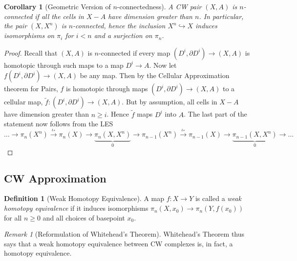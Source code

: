 \documentclass[reqno]{amsart}
\newtheorem{corollary}[theorem]{Corollary}
\theoremstyle{definition}
\newtheorem{definition}[theorem]{Definition}
\theoremstyle{remark}
\newtheorem*{remark}{Remark}
\begin{document}
\begin{corollary}[Geometric Version of
    $n$-connectedness]\label{n-connectedness-geometrically}
    A CW pair $\left( X,A \right) $ is $n$-connected
    if all the cells in $X - A$ have dimension
    greater than $n$. In particular, the
    pair  $\left( X, X^{n} \right) $ is
    $n$-connected, hence the
    inclusion $X^{n} \hookrightarrow X$ induces
    isomorphisms on $\pi_i$ for $i < n$ and
    a surjection on $\pi_n$.
\end{corollary}

\begin{proof}
    Recall that $\left( X,A \right) $ is $n$-connected
    if every map
    $\left( D^{i}, \partial D^{i} \right) 
    \to \left( X,A \right) $ is homotopic through
    such maps to a map $D^{i} \to A$.
    Now let
    $f \left( D^{i}, \partial D^{i} \right) 
    \to \left( X,A \right) $ be any map.
    Then by the Cellular Approximation theorem for
    Pairs, $f$ is homotopic through maps
    $\left( D^{i} ,\partial D^{i} \right) \to 
    \left( X,A \right) $ to a cellular map, 
    $\tilde{f} \colon \left( D^{i} , \partial D^{i} \right) 
    \to \left( X,A \right) $. But by assumption, all
    cells in $X-A$ have dimension greater than
    $n \ge i$. Hence $\tilde{f}$ maps
    $D^{i}$ into $A$.
    The last part of the statement now follows from the LES
    \[
    \ldots \to \pi_n (X^{n}) \stackrel{\iota_*}{\to} \pi_n(X) \to 
    \underbrace{\pi_n\left( X,X^{n} \right)}_{0} \to 
    \pi_{n-1}(X^{n}) \stackrel{\iota_*}{\to}  \pi_{n-1}(X) \to 
    \underbrace{\pi_{n-1}\left( X, X^{n} \right)}_{0} \to \ldots
    \] 
\end{proof}

\subsection{CW Approximation}

\begin{definition}[Weak Homotopy Equivalence]
    A map $f \colon X \to Y$ is called a
    \textit{weak homotopy equivalence} if it induces
    isomorphisms $\pi_n \left( X, x_0 \right) 
    \to \pi_n \left( Y, f(x_0) \right) $ for all
    $n \ge 0$ and all choices
    of basepoint $x_0$.
\end{definition}

\begin{remark}[Reformulation of Whitehead's Theorem]
    Whitehead's Theorem thus says that
    a weak homotopy equivalence between
     CW complexes is, in fact, a homotopy equivalence.
\end{remark}
\end{document}
